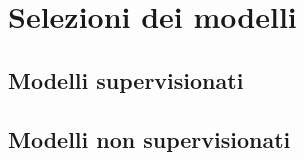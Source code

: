 \section{Selezioni dei modelli}
\subsection{Modelli supervisionati}        

\subsection{Modelli non supervisionati}

